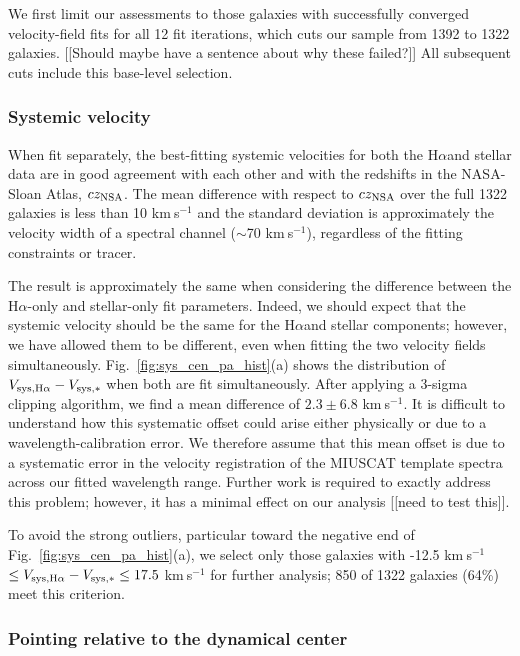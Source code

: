 \documentclass[apj,iop,revtex4,numberedappendix]{emulateapj}
\newcommand{\kms}{{km$~\!$s$^{-1}$}}
\newcommand{\halpha}{H$\alpha$}
\begin{document}
We first limit our assessments to those galaxies with successfully
converged velocity-field fits for all 12 fit iterations, which cuts our
sample from 1392 to 1322 galaxies.  [[Should maybe have a sentence about
why these failed?]]  All subsequent cuts include this base-level
selection.

\subsubsection{Systemic velocity}

When fit separately, the best-fitting systemic velocities for both the
\halpha and stellar data are in good agreement with each other and with
the redshifts in the NASA-Sloan Atlas, $cz_{\rm NSA}$.  The mean
difference with respect to $cz_{\rm NSA}$ over the full 1322 galaxies is
less than 10 \kms{} and the standard deviation is approximately the
velocity width of a spectral channel ($\sim$70 \kms{}), regardless of
the fitting constraints or tracer.

The result is approximately the same when considering the difference
between the \halpha-only and stellar-only fit parameters.  Indeed, we
should expect that the systemic velocity should be the same for the
\halpha and stellar components; however, we have allowed them to be
different, even when fitting the two velocity fields simultaneously.
Fig.~\ref{fig:sys_cen_pa_hist}(a) shows the distribution of $V_{{\rm
sys,H}\alpha} - V_{{\rm sys},\ast}$ when both are fit simultaneously.
After applying a 3-sigma clipping algorithm, we find a mean difference
of $2.3\pm6.8$ \kms{}.  It is difficult to understand how this
systematic offset could arise either physically or due to a
wavelength-calibration error.  We therefore assume that this mean offset
is due to a systematic error in the velocity registration of the MIUSCAT
template spectra across our fitted wavelength range.  Further work is
required to exactly address this problem; however, it has a minimal
effect on our analysis [[need to test this]].

To avoid the strong outliers, particular toward the negative end of
Fig.~\ref{fig:sys_cen_pa_hist}(a), we select only those galaxies with
-12.5 \kms{} $\leq V_{{\rm sys,H}\alpha} - V_{{\rm sys},\ast} \leq 17.5$
\kms{} for further analysis; 850 of 1322 galaxies (64\%) meet this
criterion.

\subsubsection{Pointing relative to the dynamical center}
\end{document}
